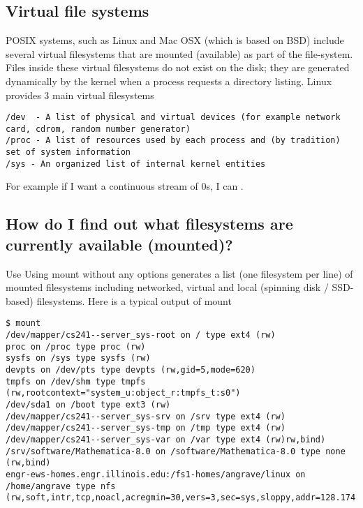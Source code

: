 \subsection{Virtual file systems}\label{virtual-file-systems}

POSIX systems, such as Linux and Mac OSX (which is based on BSD) include several virtual filesystems that are mounted (available) as part of the file-system. Files inside these virtual filesystems do not exist on the disk; they are generated dynamically by the kernel when a process requests a directory listing. Linux provides 3 main virtual filesystems

\begin{lstlisting}
/dev  - A list of physical and virtual devices (for example network card, cdrom, random number generator)
/proc - A list of resources used by each process and (by tradition) set of system information
/sys - An organized list of internal kernel entities
\end{lstlisting}

For example if I want a continuous stream of 0s, I can .

\subsection{How do I find out what filesystems are currently available (mounted)?}\label{how-do-i-find-out-what-filesystems-are-currently-available-mounted}

Use  Using mount without any options generates a list (one filesystem per line) of mounted filesystems including networked, virtual and local (spinning disk / SSD-based) filesystems. Here is a typical output of mount

\begin{lstlisting}
$ mount
/dev/mapper/cs241--server_sys-root on / type ext4 (rw)
proc on /proc type proc (rw)
sysfs on /sys type sysfs (rw)
devpts on /dev/pts type devpts (rw,gid=5,mode=620)
tmpfs on /dev/shm type tmpfs (rw,rootcontext="system_u:object_r:tmpfs_t:s0")
/dev/sda1 on /boot type ext3 (rw)
/dev/mapper/cs241--server_sys-srv on /srv type ext4 (rw)
/dev/mapper/cs241--server_sys-tmp on /tmp type ext4 (rw)
/dev/mapper/cs241--server_sys-var on /var type ext4 (rw)rw,bind)
/srv/software/Mathematica-8.0 on /software/Mathematica-8.0 type none (rw,bind)
engr-ews-homes.engr.illinois.edu:/fs1-homes/angrave/linux on /home/angrave type nfs (rw,soft,intr,tcp,noacl,acregmin=30,vers=3,sec=sys,sloppy,addr=128.174.252.102)
\end{lstlisting}

